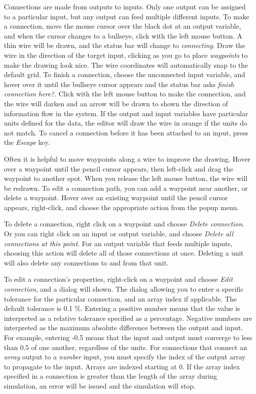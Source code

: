 \documentclass{article}
\begin{document}
Connections are made from outputs to inputs.  Only one output can be assigned to a particular input, but any output can feed multiple different inputs.  To make a connection, move the mouse cursor over the black dot at an output variable, and when the cursor changes to a bullseye, click with the left mouse button.  A thin wire will be drawn, and the status bar will change to \emph{connecting}.  Draw the wire in the direction of the target input, clicking as you go to place \emph{waypoints} to make the drawing look nice.  The wire coordinates will automatically snap to the default grid.  To finish a connection, choose the unconnected input variable, and hover over it until the bullseye cursor appears and the status bar asks \emph{finish connection here?}.  Click with the left mouse button to make the connection, and the wire will darken and an arrow will be drawn to shown the direction of information flow in the system.  If the output and input variables have particular units defined for the data, the editor will draw the wire in orange if the units do not match.  To cancel a connection before it has been attached to an input, press the \emph{Escape} key.

Often it is helpful to move waypoints along a wire to improve the drawing.  Hover over a waypoint until the pencil cursor appears, then left-click and drag the waypoint to another spot.  When you release the left mouse button, the wire will be redrawn.  To edit a connection path, you can add a waypoint near another, or delete a waypoint.  Hover over an existing waypoint until the pencil cursor appears, right-click, and choose the appropriate action from the popup menu.

To delete a connection, right click on a waypoint and choose \emph{Delete connection}.  Or you can right click on an input or output variable, and choose \emph{Delete all connections at this point}.  For an output variable that feeds multiple inputs, choosing this action will delete all of those connections at once.  Deleting a unit will also delete any connections to and from that unit.

To edit a connection's properties, right-click on a waypoint and choose \emph{Edit connection}, and a dialog will shown.  The dialog allowing you to enter a specific tolerance for the particular connection, and an array index if applicable.  The default tolerance is 0.1 \%.  Entering a positive number means that the value is interpreted as a relative tolerance specified as a percentage.  Negative numbers are interpreted as the maximum absolute difference between the output and input.  For example, entering -0.5 means that the input and output must converge to less than 0.5 of one another, regardless of the units.  For connections that connect an \emph{array} output to a \emph{number} input, you must specify the index of the output array to propagate to the input.  Arrays are indexed starting at 0.  If the array index specified in a connection is greater than the length of the array during simulation, an error will be issued and the simulation will stop.
\end{document}
